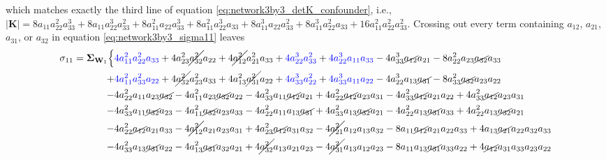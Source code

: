 \documentclass{article}
\begin{document}
which matches exactly the third line of equation \ref{eq:network3by3_detK_confounder}, i.e., $|\mathbf{K}| = 8 a_{11} a_{22}^{2} a_{33}^{3} + 8 a_{11} a_{22}^{3} a_{33}^{2} + 8 a_{11}^{2} a_{22} a_{33}^{3} + 8 a_{11}^{2} a_{22}^{3} a_{33} + 8 a_{11}^{3} a_{22} a_{33}^{2} + 8 a_{11}^{3} a_{22}^{2} a_{33} + 16 a_{11}^{2} a_{22}^{2} a_{33}^{2}$. 
Crossing out every term containing $a_{12}$, $a_{21}$, $a_{31}$, or $a_{32}$ in equation \ref{eq:network3by3_sigma11} leaves
\begin{equation}
\begin{aligned}
 \sigma_{11} =  \mathbf{\Sigma}_{\textbf{W}_{1}} \Bigl\{ & \textcolor{blue}{4 a_{11}^{2} a_{22}^{2} a_{33}} + 4 a_{23}^{2} \cancel{a_{32}^{2}} a_{22} + 4 \cancel{a_{12}^{2}} a_{21}^{2} a_{33} + \textcolor{blue}{4 a_{22}^{3} a_{33}^{2}} + \textcolor{blue}{4 a_{22}^{3} a_{11} a_{33}} - 4 a_{33}^{3} \cancel{a_{12}} a_{21} - 8 a_{22}^{2} a_{23} \cancel{a_{32}} a_{33} \\
+ & \textcolor{blue}{4 a_{11}^{2} a_{33}^{2} a_{22}} + 4 \cancel{a_{32}^{2}} a_{23}^{2} a_{33} + 4 a_{13}^{2} \cancel{a_{31}^{2}} a_{22} + \textcolor{blue}{4 a_{33}^{3} a_{22}^{2}} + \textcolor{blue}{4 a_{33}^{3} a_{11} a_{22}} - 4 a_{22}^{3} a_{13} \cancel{a_{31}} - 8 a_{33}^{2} \cancel{a_{32}} a_{23} a_{22} \\
-& 4 a_{22}^{2} a_{11} a_{23} \cancel{a_{32}} - 4 a_{11}^{2} a_{23} \cancel{a_{32}} a_{22} - 4 a_{33}^{2} a_{11} \cancel{a_{12}} a_{21} + 4 a_{22}^{2} \cancel{a_{12}} a_{23} a_{31} - 4 a_{33}^{2} \cancel{a_{12}} a_{21} a_{22} + 4 a_{33}^{2} \cancel{a_{12}} a_{23} a_{31} \\
-& 4 a_{33}^{2} a_{11} \cancel{a_{32}} a_{23} - 4 a_{11}^{2} \cancel{a_{32}} a_{23} a_{33} - 4 a_{22}^{2} a_{11} a_{13} \cancel{a_{31}} + 4 a_{33}^{2} a_{13} \cancel{a_{32}} a_{21} - 4 a_{22}^{2} a_{13} \cancel{a_{31}} a_{33} + 4 a_{22}^{2} a_{13} \cancel{a_{32}} a_{21} \\
-& 4 a_{22}^{2} \cancel{a_{12}} a_{21} a_{33} - 4 \cancel{a_{12}^{2}} a_{21} a_{23} a_{31} + 4 a_{23}^{2} \cancel{a_{12}} a_{31} a_{32} - 4 \cancel{a_{21}^{2}} a_{12} a_{13} a_{32} - 8 a_{11} \cancel{a_{12}} a_{21} a_{22} a_{33} + 4 a_{13} \cancel{a_{21}} a_{22} a_{32} a_{33} \\
-& 4 a_{33}^{2} a_{13} \cancel{a_{31}} a_{22} - 4 a_{13}^{2} \cancel{a_{31}} a_{32} a_{21} + 4 \cancel{a_{32}^{2}} a_{13} a_{21} a_{23} - 4 \cancel{a_{31}^{2}} a_{13} a_{12} a_{23} - 8 a_{11} a_{13} \cancel{a_{31}} a_{33} a_{22} + 4 \cancel{a_{12}} a_{31} a_{33} a_{23} a_{22} \\

\end{aligned}
\end{equation}
\end{document}
